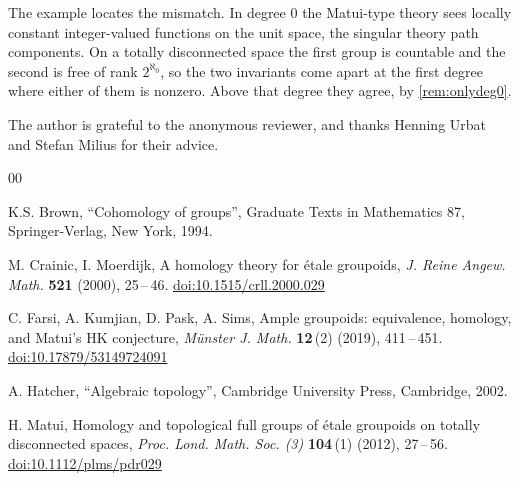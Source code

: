 \documentclass{extracta-temp-26}
\numberwithin{equation}{section}
\theoremstyle{definition}
\theoremstyle{remark}
\begin{document}
The example locates the mismatch.
In degree \(0\) the Matui-type theory sees locally constant integer-valued functions on the unit space, the singular theory path components.
On a totally disconnected space the first group is countable and the second is free of rank \(2^{\aleph_0}\), so the two invariants come apart at the first degree where either of them is nonzero.
Above that degree they agree, by \cref{rem:onlydeg0}.

\begin{acknowledgements}
The author is grateful to the anonymous reviewer, and thanks Henning Urbat and Stefan Milius for their advice.
\end{acknowledgements}

\baselineskip 10pt

\begin{thebibliography}{00}

 {\sc K.S. Brown,} {\small ``Cohomology of groups'', Graduate Texts in Mathematics 87, Springer-Verlag, New York, 1994.}

 {\sc M. Crainic, I. Moerdijk,} {\small A homology theory for \'etale groupoids, {\it J. Reine Angew. Math.} {\bf 521} (2000), 25\,--\,46. \href{https://doi.org/10.1515/crll.2000.029}{doi:10.1515/crll.2000.029}}

 {\sc C. Farsi, A. Kumjian, D. Pask, A. Sims,} {\small Ample groupoids: equivalence, homology, and Matui's HK conjecture, {\it M\"unster J. Math.} {\bf 12}\,(2) (2019), 411\,--\,451. \href{https://doi.org/10.17879/53149724091}{doi:10.17879/53149724091}}

 {\sc A. Hatcher,} {\small ``Algebraic topology'', Cambridge University Press, Cambridge, 2002.}

 {\sc H. Matui,} {\small Homology and topological full groups of \'etale groupoids on totally disconnected spaces, {\it Proc. Lond. Math. Soc. (3)} {\bf 104}\,(1) (2012), 27\,--\,56. \href{https://doi.org/10.1112/plms/pdr029}{doi:10.1112/plms/pdr029}}

\end{thebibliography}
\end{document}
